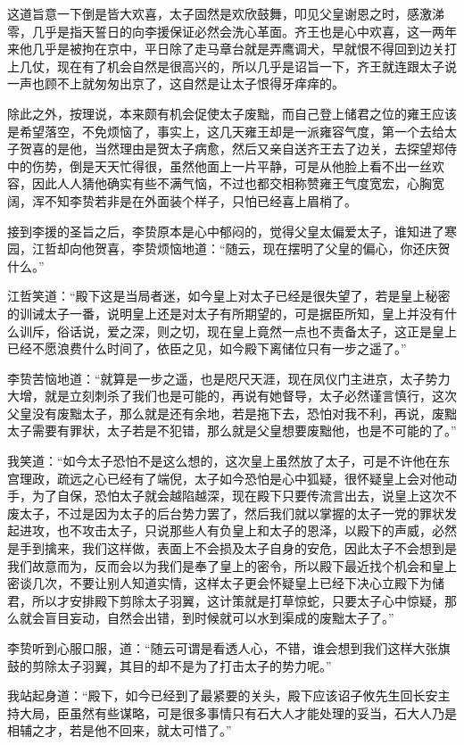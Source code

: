 这道旨意一下倒是皆大欢喜，太子固然是欢欣鼓舞，叩见父皇谢恩之时，感激涕零，几乎是指天誓日的向李援保证必然会洗心革面。齐王也是心中欢喜，这一两年来他几乎是被拘在京中，平日除了走马章台就是弄鹰调犬，早就恨不得回到边关打上几仗，现在有了机会自然是很高兴的，所以几乎是诏旨一下，齐王就连跟太子说一声也顾不上就匆匆出京了，这自然是让太子恨得牙痒痒的。

除此之外，按理说，本来颇有机会促使太子废黜，而自己登上储君之位的雍王应该是希望落空，不免烦恼了，事实上，这几天雍王却是一派雍容气度，第一个去给太子贺喜的是他，当然理由是贺太子病愈，然后又亲自送齐王去了边关，去探望郑侍中的伤势，倒是天天忙得很，虽然他面上一片平静，可是从他脸上看不出一丝欢容，因此人人猜他确实有些不满气恼，不过也都交相称赞雍王气度宽宏，心胸宽阔，浑不知李贽若非是在外面装个样子，只怕已经喜上眉梢了。

接到李援的圣旨之后，李贽原本是心中郁闷的，觉得父皇太偏爱太子，谁知进了寒园，江哲却向他贺喜，李贽烦恼地道：“随云，现在摆明了父皇的偏心，你还庆贺什么。”

江哲笑道：“殿下这是当局者迷，如今皇上对太子已经是很失望了，若是皇上秘密的训诫太子一番，说明皇上还是对太子有所期望的，可是据臣所知，皇上并没有什么训斥，俗话说，爱之深，则之切，现在皇上竟然一点也不责备太子，这正是皇上已经不愿浪费什么时间了，依臣之见，如今殿下离储位只有一步之遥了。”

李贽苦恼地道：“就算是一步之遥，也是咫尺天涯，现在凤仪门主进京，太子势力大增，就是立刻刺杀了我们也是可能的，再说有她督导，太子必然谨言慎行，这次父皇没有废黜太子，那么就是还有余地，若是拖下去，恐怕对我不利，再说，废黜太子需要有罪状，太子若是不犯错，那么就是父皇想要废黜他，也是不可能的了。”

我笑道：“如今太子恐怕不是这么想的，这次皇上虽然放了太子，可是不许他在东宫理政，疏远之心已经有了端倪，太子如今恐怕是心中狐疑，很怀疑皇上会对他动手，为了自保，恐怕太子就会越陷越深，现在殿下只要传流言出去，说皇上这次不废太子，不过是因为太子的后台势力罢了，然后我们就以掌握的太子一党的罪状发起进攻，也不攻击太子，只说那些人有负皇上和太子的恩泽，以殿下的声威，必然是手到擒来，我们这样做，表面上不会损及太子自身的安危，因此太子不会想到是我们故意而为，反而会以为我们是奉了皇上的密令，所以殿下最近找个机会和皇上密谈几次，不要让别人知道实情，这样太子更会怀疑皇上已经下决心立殿下为储君，所以才安排殿下剪除太子羽翼，这计策就是打草惊蛇，只要太子心中惊疑，那么就会盲目妄动，自然会出错，到时候就可以水到渠成的废黜太子了。”

李贽听到心服口服，道：“随云可谓是看透人心，不错，谁会想到我们这样大张旗鼓的剪除太子羽翼，其目的却不是为了打击太子的势力呢。”

我站起身道：“殿下，如今已经到了最紧要的关头，殿下应该诏子攸先生回长安主持大局，臣虽然有些谋略，可是很多事情只有石大人才能处理的妥当，石大人乃是相辅之才，若是他不回来，就太可惜了。”

